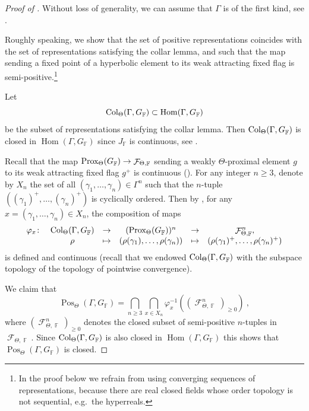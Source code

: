 \documentclass{amsart}
\theoremstyle{plain}
\theoremstyle{definition}
\DeclareMathOperator{\Hom}{Hom}
\DeclareMathOperator{\Pos}{Pos}
\DeclareMathOperator{\Fc}{\mathcal{F}}
\DeclareMathOperator{\Fb}{{\mathbb{F}}}
\newcommand{\CL}{\textnormal{Col}}
\newcommand{\Prox}{\textnormal{Prox}}
\newcommand{\1}{\mathbf{1}}
\begin{document}
\begin{proof}[Proof of ]
    Without loss of generality, we can assume that $\Gamma$ is of the first kind, see .
    
    Roughly speaking, we show that the set of positive representations coincides with the set of representations satisfying the collar lemma, and such that the map sending a fixed point of a hyperbolic element to its weak attracting fixed flag is semi-positive.\footnote{In the proof below we refrain from using converging sequences of representations, because there are real closed fields whose order topology is not sequential, e.g.\ the hyperreals.}

    Let \[\CL_\Theta(\Gamma,G_{\Fb})\subset \Hom(\Gamma,G_{\Fb})
    \]
    be the subset of representations satisfying the collar lemma.
    Then $\CL_\Theta(\Gamma,G_{\Fb})$ is closed in $\Hom(\Gamma,G_{\Fb})$ since $J_{\Fb}$ is continuous, see .

    Recall that the map $\Prox_\Theta(G_{\Fb}) \to \Fc_{\Theta,\Fb}$ sending a weakly $\Theta$-proximal element $g$ to its weak attracting fixed flag $g^+$ is continuous ().
    For any integer $n\ge 3$, denote by $X_n$ the set of all $(\gamma_1,\ldots,\gamma_n) \in \Gamma^n$ such that the $n$-tuple $((\gamma_1)^+,\ldots,(\gamma_n)^+)$ is cyclically ordered. Then by , for any $x=(\gamma_1,\dots,\gamma_n) \in X_n$, the composition of maps
    \[
    \begin{array}{cccccc}
    \varphi_x \colon &\CL_\Theta(\Gamma,G_{\Fb}) &\to& (\Prox_\Theta(G_{\Fb}))^n &\to& \Fc_{\Theta,\Fb}^n,\\
    &\rho &\mapsto& (\rho(\gamma_1),\ldots,\rho(\gamma_n)) &\mapsto& (\rho(\gamma_1)^+,\ldots,\rho(\gamma_n)^+)
    \end{array}
    \]
    is defined and continuous (recall that we endowed $\CL_\Theta(\Gamma,G_{\Fb})$ with the subspace topology of the topology of pointwise convergence).
    
    We claim that 
    \[\Pos_\Theta(\Gamma,G_{\Fb}) = \bigcap_{n \ge 3} \bigcap_{x \in X_n} \varphi_x^{-1}((\Fc_{\Theta,\Fb}^n)_{\geq 0})~,\]
    where $(\Fc_{\Theta,\Fb}^n)_{\geq 0}$ denotes the closed subset of semi-positive $n$-tuples in $\Fc_{\Theta,\Fb}$.
    Since $\CL_\Theta(\Gamma,G_{\Fb})$ is also closed in $\Hom(\Gamma,G_{\Fb})$ this shows that $\Pos_\Theta(\Gamma,G_{\Fb})$ is closed.
    

\end{proof}
\end{document}

